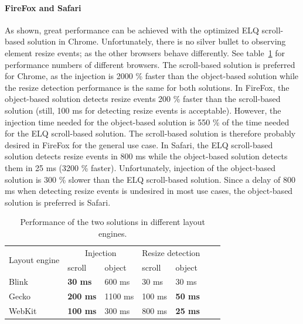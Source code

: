 \documentclass[a4paper,11pt]{kth-mag}
\begin{document}
        \paragraph{FireFox and Safari}
        As shown, great performance can be achieved with the optimized \gls{ELQ} scroll-based solution in Chrome.
        Unfortunately, there is no silver bullet to observing element resize events; as the other browsers behave differently.
        See table~\ref{table:erd-layout-engines} for performance numbers of different browsers.
        The scroll-based solution is preferred for Chrome, as the injection is 2000 \% faster than the object-based solution while the resize detection performance is the same for both solutions.
        In FireFox, the object-based solution detects resize events 200 \% faster than the scroll-based solution (still, 100 ms for detecting resize events is acceptable).
        However, the injection time needed for the object-based solution is 550 \% of the time needed for the \gls{ELQ} scroll-based solution.
        The scroll-based solution is therefore probably desired in FireFox for the general use case.
        In Safari, the \gls{ELQ} scroll-based solution detects resize events in 800 ms while the object-based solution detects them in 25 ms (3200 \% faster).
        Unfortunately, injection of the object-based solution is 300 \% slower than the \gls{ELQ} scroll-based solution.
        Since a delay of 800 ms when detecting resize events is undesired in most use cases, the object-based solution is preferred is Safari.
        \begin{table}[ht]\center
          \tiny
          \begin{tabular}[t]{ l l l l l l l }
            \multirow{2}{*}{Layout engine} & \multicolumn{2}{c}{Injection} & \multicolumn{2}{c}{Resize detection} \\
            & scroll & object & scroll & object \\
            \hline
            Blink   & \textbf{30 ms}   & 600 ms    & 30 ms   & 30 ms           \\
            Gecko   & \textbf{200 ms}  & 1100 ms   & 100 ms  & \textbf{50 ms}  \\
            WebKit  & \textbf{100 ms}  & 300 ms    & 800 ms  & \textbf{25 ms}  \\
          \end{tabular}
          \caption{Performance of the two solutions in different layout engines.}
          \label{table:erd-layout-engines}
        \end{table}
\end{document}

